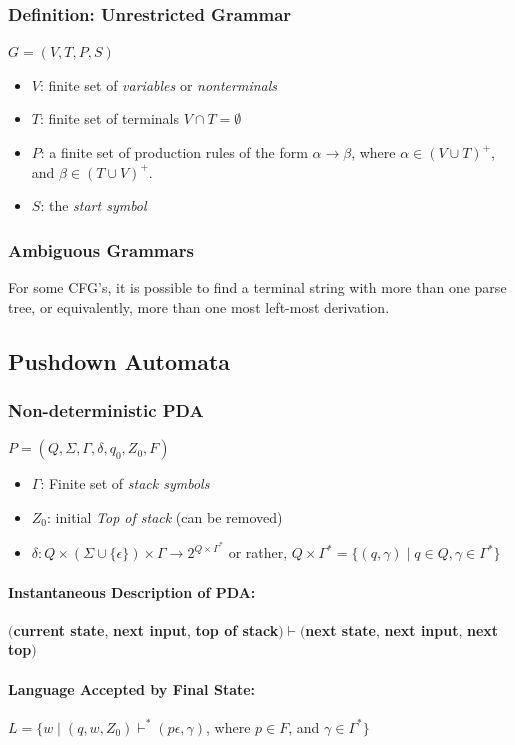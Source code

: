 \documentclass[20pt]{article} %
\begin{document}
\subsubsection{Definition: \textbf{Unrestricted Grammar}}
$G = (V, T, P, S)$
\begin{itemize}
\item $V$: finite set of \textit{variables} or \textit{nonterminals}
\item $T$: finite set of terminals $V \cap T = \emptyset$
\item $P$: a finite set of production rules of the form $\alpha \rightarrow \beta$, where $\alpha \in (V \cup T)^{+}$, and $\beta \in (T \cup V)^{+}$.
\item $S$: the \textit{start symbol}
\end{itemize}
\subsubsection{Ambiguous Grammars}
For some CFG's, it is possible to find a terminal string with more than one parse tree, or equivalently, more than one most left-most derivation.
\subsection{Pushdown Automata}
\subsubsection{Non-deterministic PDA}
$P = (Q, \Sigma, \Gamma, \delta, q_0, Z_0, F)$
\begin{itemize}
\item $\Gamma$: Finite set of \textit{stack symbols}
\item $Z_0$: initial \textit{Top of stack} (can be removed)
\item $\delta: Q \times (\Sigma \cup \{ \epsilon \}) \times \Gamma \rightarrow 2^{Q \times \Gamma^{*}}$ or rather, $Q \times \Gamma^{*} = \{ (q,\gamma) \mid q \in Q, \gamma \in \Gamma^{*} \}$
\end{itemize}
\paragraph{Instantaneous Description of PDA: } $($\textbf{current state}, \textbf{next input}, \textbf{top of stack}$) \vdash ($\textbf{next state}, \textbf{next input}, \textbf{next top}$)$
\paragraph{Language Accepted by \textbf{Final State}: } $L = \{ w \mid (q,w, Z_0) \vdash^{*} (p \epsilon, \gamma)$, where $p \in F$, and $\gamma \in \Gamma^{*} \}$
\end{document}
